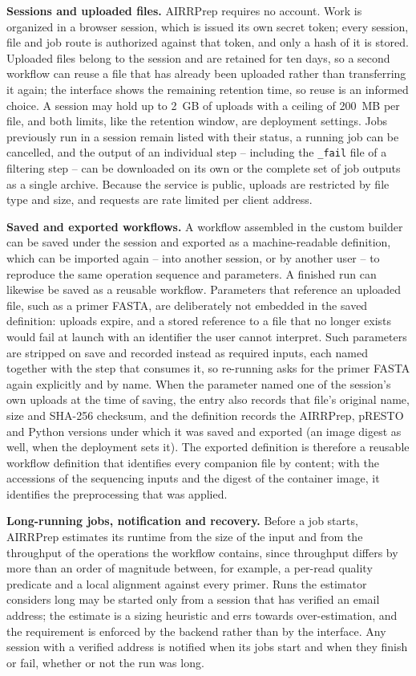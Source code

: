 \documentclass[11pt]{article}
\begin{document}
\textbf{Sessions and uploaded files.} AIRRPrep requires no account. Work is
organized in a browser session, which is issued its own secret token; every
session, file and job route is authorized against that token, and only a hash
of it is stored. Uploaded files belong to the session and are retained for ten
days, so a second workflow can reuse a file that has already been uploaded
rather than transferring it again; the interface shows the remaining retention
time, so reuse is an informed choice. A session may hold up to 2~GB of uploads
with a ceiling of 200~MB per file, and both limits, like the retention window,
are deployment settings. Jobs previously run in a session remain listed with
their status, a running job can be cancelled, and the output of an individual
step -- including the \texttt{\_fail} file of a filtering step -- can be
downloaded on its own or the complete set of job outputs as a single archive.
Because the service is public, uploads are restricted by file type and size,
and requests are rate limited per client address.

\textbf{Saved and exported workflows.} A workflow assembled in the custom
builder can be saved under the session and exported as a machine-readable
definition, which can be imported again -- into another session, or by another
user -- to reproduce the same operation sequence and parameters. A finished run
can likewise be saved as a reusable workflow. Parameters that reference an
uploaded file, such as a primer FASTA, are deliberately not embedded in the
saved definition: uploads expire, and a stored reference to a file that no
longer exists would fail at launch with an identifier the user cannot
interpret. Such parameters are stripped on save and recorded instead as
required inputs, each named together with the step that consumes it, so
re-running asks for the primer FASTA again explicitly and by name. When the
parameter named one of the session's own uploads at the time of saving, the
entry also records that file's original name, size and SHA-256 checksum, and
the definition records the AIRRPrep, pRESTO and Python versions under which it
was saved and exported (an image digest as well, when the deployment sets it).
The exported definition is therefore a reusable workflow definition that
identifies every companion file by content; with the accessions of the
sequencing inputs and the digest of the container image, it identifies the
preprocessing that was applied.

\textbf{Long-running jobs, notification and recovery.} Before a job starts,
AIRRPrep estimates its runtime from the size of the input and from the
throughput of the operations the workflow contains, since throughput differs by
more than an order of magnitude between, for example, a per-read quality
predicate and a local alignment against every primer. Runs the estimator
considers long may be started only from a session that has verified an email
address; the estimate is a sizing heuristic and errs towards over-estimation,
and the requirement is enforced by the backend rather than by the interface.
Any session with a verified address is notified when its jobs start and when
they finish or fail, whether or not the run was long.
\end{document}
